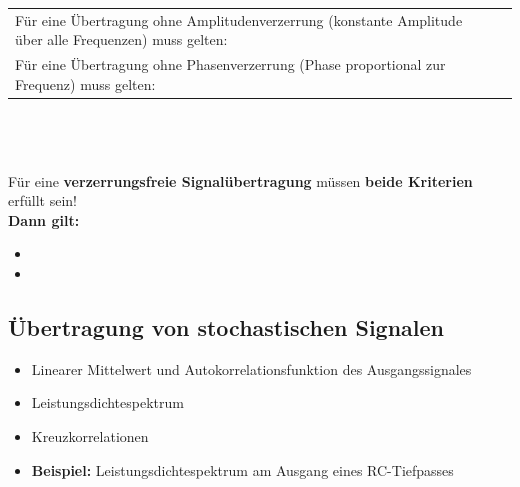 			\begin{tabularx}{\textwidth}{p{9cm}X}
				Für eine Übertragung ohne Amplitudenverzerrung \newline (konstante Amplitude über alle Frequenzen) muss gelten:
			&	$ $ \newline \fbox{$|H(j\omega)| = konstant$}
			\\
			Für eine Übertragung ohne Phasenverzerrung \newline (Phase proportional zur Frequenz) muss gelten:
			&	$ $ \newline \fbox{$\theta(\omega) = -\omega t_0$}
			\end{tabularx}\\
			\\ \\
			Für eine \textbf{verzerrungsfreie Signalübertragung} müssen \textbf{beide Kriterien} erfüllt sein!\\
			\textbf{Dann gilt:}
			\begin{itemize}
				\item {}
				\item {}
			\end{itemize}	
		
	\subsection{Übertragung von stochastischen Signalen }
		\begin{itemize}
			\item Linearer Mittelwert und Autokorrelationsfunktion des Ausgangssignales 
			\item Leistungsdichtespektrum 
			\item Kreuzkorrelationen 
			\item \textbf{Beispiel:} Leistungsdichtespektrum am Ausgang eines RC-Tiefpasses 
		\end{itemize}
		
		
		
		
		
		
		